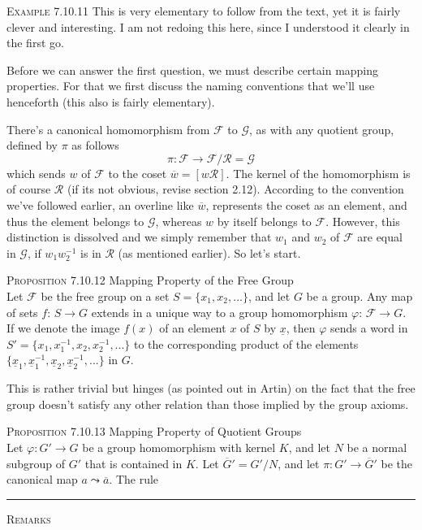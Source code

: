 \documentclass[12pt]{article}
\begin{document}
\textsc {Example 7.10.11} This is very elementary to follow from the text, yet it is fairly clever and interesting. I am not redoing this here, since I understood it clearly in the first go.
\par
Before we can answer the first question, we must describe certain mapping properties. For that we first discuss the naming conventions that we'll use henceforth (this also is fairly elementary).
\par
There's a canonical homomorphism from $\mathcal F$ to $\mathcal G$, as with any quotient group, defined by $\pi$ as follows
\begin{equation*}
\pi : \mathcal {F \rightarrow F/R = G}
\end{equation*}
which sends $w$ of $\mathcal F$ to the coset $\overline w = [w\mathcal R]$. The kernel of the homomorphism is of course $\mathcal R$ (if its not obvious, revise section 2.12). According to the convention we've followed earlier, an overline like $\overline w$, represents the coset as an element, and thus the element belongs to $\mathcal G$, whereas $w$ by itself belongs to $\mathcal F$. However, this distinction is dissolved and we simply remember that $w_{1}$ and $w_{2}$ of $\mathcal F$ are equal in $\mathcal G$, if $w_{1}w_{2}^{-1}$ is in $\mathcal R$ (as mentioned earlier). So let's start.
\par
\textsc {Proposition 7.10.12} Mapping Property of the Free Group\\
Let $\mathcal F$ be the free group on a set $S=\{x_{1},x_{2},...\}$, and let $G$ be a group. Any map of sets $f:\,S \rightarrow G$ extends in a unique way to a group homomorphism $\varphi : \, \mathcal F \rightarrow G$. If we denote the image $f(x)$ of an element $x$ of $S$ by $\underline x$, then $\varphi$ sends a word in $S'=\{x_{1},x_{1}^{-1},x_{2},x_{2}^{-1},...\}$ to the corresponding product of the elements $\{\underline x_{1}, \underline x_{1}^{-1}, \underline x_{2}, \underline x_{2}^{-1},...\}$ in $G$.
\par
This is rather trivial but hinges (as pointed out in Artin) on the fact that the free group doesn't satisfy any other relation than those implied by the group axioms.
\par
\textsc {Proposition 7.10.13} Mapping Property of Quotient Groups\\
Let $\varphi : G' \rightarrow G$ be a group homomorphism with kernel $K$, and let $N$ be a normal subgroup of $G'$ that is contained in $K$. Let $\overline G' = G'/N$, and let $\pi : G' \rightarrow \overline G'$ be the canonical map $a \leadsto \overline a$. The rule 
\vspace{500pt}
\hrule
\vspace{12pt}
\begin{center}
{\textsc {Remarks}}
\end{center}
\end{document}
